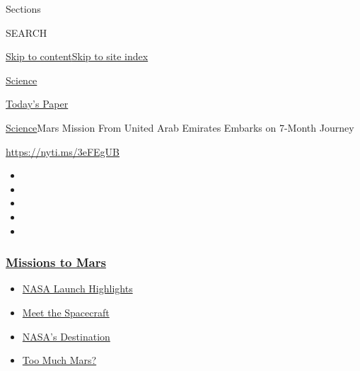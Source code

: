 Sections

SEARCH

\protect\hyperlink{site-content}{Skip to
content}\protect\hyperlink{site-index}{Skip to site index}

\href{https://www.nytimes3xbfgragh.onion/section/science}{Science}

\href{https://myaccount.nytimes3xbfgragh.onion/auth/login?response_type=cookie\&client_id=vi}{}

\href{https://www.nytimes3xbfgragh.onion/section/todayspaper}{Today's
Paper}

\href{/section/science}{Science}\textbar{}Mars Mission From United Arab
Emirates Embarks on 7-Month Journey

\url{https://nyti.ms/3eFEgUB}

\begin{itemize}
\item
\item
\item
\item
\item
\end{itemize}

\hypertarget{missions-to-mars}{%
\subsubsection{\texorpdfstring{\href{https://www.nytimes3xbfgragh.onion/news-event/summer-of-mars?name=styln-mars\&region=TOP_BANNER\&variant=undefined\&block=storyline_menu_recirc\&action=click\&pgtype=Article\&impression_id=a7e61be0-e391-11ea-9027-41a96f0fd4e9}{Missions
to Mars}}{Missions to Mars}}\label{missions-to-mars}}

\begin{itemize}
\tightlist
\item
  \href{https://www.nytimes3xbfgragh.onion/2020/07/30/science/nasa-mars-launch.html?name=styln-mars\&region=TOP_BANNER\&variant=undefined\&block=storyline_menu_recirc\&action=click\&pgtype=Article\&impression_id=a7e642f0-e391-11ea-9027-41a96f0fd4e9}{NASA
  Launch Highlights}
\item
  \href{https://www.nytimes3xbfgragh.onion/interactive/2020/science/mars-perseverance-tianwen-hope.html?name=styln-mars\&region=TOP_BANNER\&variant=undefined\&block=storyline_menu_recirc\&action=click\&pgtype=Article\&impression_id=a7e642f1-e391-11ea-9027-41a96f0fd4e9}{Meet
  the Spacecraft}
\item
  \href{https://www.nytimes3xbfgragh.onion/2020/07/28/science/nasa-jezero-perseverance.html?name=styln-mars\&region=TOP_BANNER\&variant=undefined\&block=storyline_menu_recirc\&action=click\&pgtype=Article\&impression_id=a7e642f2-e391-11ea-9027-41a96f0fd4e9}{NASA's
  Destination}
\item
  \href{https://www.nytimes3xbfgragh.onion/2020/07/28/science/mars-nasa-science.html?name=styln-mars\&region=TOP_BANNER\&variant=undefined\&block=storyline_menu_recirc\&action=click\&pgtype=Article\&impression_id=a7e642f3-e391-11ea-9027-41a96f0fd4e9}{Too
  Much Mars?}
\end{itemize}

